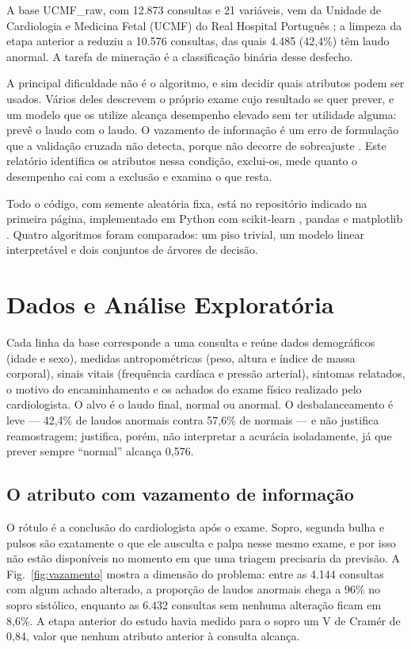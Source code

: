 \documentclass[conference]{IEEEtran}
\begin{document}
A base UCMF\_raw, com 12.873 consultas e 21 variáveis, vem da Unidade de Cardiologia e Medicina Fetal (UCMF) do Real Hospital Português \cite{dados}; a limpeza da etapa anterior a reduziu a 10.576 consultas, das quais 4.485 (42,4\%) têm laudo anormal. A tarefa de mineração é a classificação binária desse desfecho.

A principal dificuldade não é o algoritmo, e sim decidir quais atributos podem ser usados. Vários deles descrevem o próprio exame cujo resultado se quer prever, e um modelo que os utilize alcança desempenho elevado sem ter utilidade alguma: prevê o laudo com o laudo. O vazamento de informação é um erro de formulação que a validação cruzada não detecta, porque não decorre de sobreajuste \cite{kaufman}. Este relatório identifica os atributos nessa condição, exclui-os, mede quanto o desempenho cai com a exclusão e examina o que resta.

Todo o código, com semente aleatória fixa, está no repositório indicado na primeira página, implementado em Python com scikit-learn \cite{sklearn}, pandas \cite{pandas} e matplotlib \cite{matplotlib}. Quatro algoritmos foram comparados: um piso trivial, um modelo linear interpretável e dois conjuntos de árvores de decisão.

\section{Dados e Análise Exploratória}
Cada linha da base corresponde a uma consulta e reúne dados demográficos (idade e sexo), medidas antropométricas (peso, altura e índice de massa corporal), sinais vitais (frequência cardíaca e pressão arterial), sintomas relatados, o motivo do encaminhamento e os achados do exame físico realizado pelo cardiologista. O alvo é o laudo final, normal ou anormal. O desbalanceamento é leve --- 42,4\% de laudos anormais contra 57,6\% de normais --- e não justifica reamostragem; justifica, porém, não interpretar a acurácia isoladamente, já que prever sempre ``normal'' alcança 0,576.

\subsection{O atributo com vazamento de informação}
O rótulo é a conclusão do cardiologista após o exame. Sopro, segunda bulha e pulsos são exatamente o que ele ausculta e palpa nesse mesmo exame, e por isso não estão disponíveis no momento em que uma triagem precisaria da previsão. A Fig.~\ref{fig:vazamento} mostra a dimensão do problema: entre as 4.144 consultas com algum achado alterado, a proporção de laudos anormais chega a 96\% no sopro sistólico, enquanto as 6.432 consultas sem nenhuma alteração ficam em 8,6\%. A etapa anterior do estudo havia medido para o sopro um V de Cramér de 0,84, valor que nenhum atributo anterior à consulta alcança.
\end{document}
